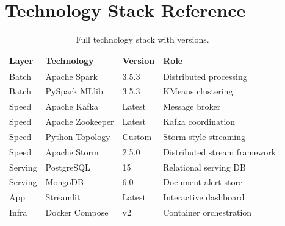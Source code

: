 \documentclass[11pt,a4paper]{article}
\begin{document}
\appendix
\section{Technology Stack Reference}

\begin{table}[H]
\centering
\caption{Full technology stack with versions.}
\begin{tabular}{@{}llll@{}}
\toprule
\textbf{Layer} & \textbf{Technology} & \textbf{Version} & \textbf{Role} \\
\midrule
Batch      & Apache Spark   & 3.5.3  & Distributed processing \\
Batch      & PySpark MLlib  & 3.5.3  & KMeans clustering \\
Speed      & Apache Kafka   & Latest & Message broker \\
Speed      & Apache Zookeeper & Latest & Kafka coordination \\
Speed      & Python Topology & Custom & Storm-style streaming \\
Speed      & Apache Storm   & 2.5.0  & Distributed stream framework \\
Serving    & PostgreSQL     & 15     & Relational serving DB \\
Serving    & MongoDB        & 6.0    & Document alert store \\
App        & Streamlit      & Latest & Interactive dashboard \\
Infra      & Docker Compose & v2     & Container orchestration \\
\bottomrule
\end{tabular}
\end{table}
\end{document}
